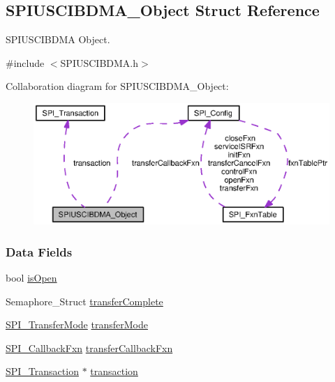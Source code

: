 \subsection{S\+P\+I\+U\+S\+C\+I\+B\+D\+M\+A\+\_\+\+Object Struct Reference}
\label{struct_s_p_i_u_s_c_i_b_d_m_a___object}


S\+P\+I\+U\+S\+C\+I\+B\+D\+M\+A Object.  




{\ttfamily \#include $<$S\+P\+I\+U\+S\+C\+I\+B\+D\+M\+A.\+h$>$}



Collaboration diagram for S\+P\+I\+U\+S\+C\+I\+B\+D\+M\+A\+\_\+\+Object\+:
\nopagebreak
\begin{figure}[H]
\begin{center}
\leavevmode
\includegraphics[width=350pt]{struct_s_p_i_u_s_c_i_b_d_m_a___object__coll__graph}
\end{center}
\end{figure}
\subsubsection*{Data Fields}
\begin{DoxyCompactItemize}
\item 
bool \hyperlink{struct_s_p_i_u_s_c_i_b_d_m_a___object_a3e6b8bb83a3cf4a65fa6fe64e621f201}{is\+Open}
\item 
Semaphore\+\_\+\+Struct \hyperlink{struct_s_p_i_u_s_c_i_b_d_m_a___object_a2facffa8ef32c57613836f4470125114}{transfer\+Complete}
\item 
\hyperlink{_s_p_i_8h_ab9ea76c6529d6076eee5e1c4a5a92c6f}{S\+P\+I\+\_\+\+Transfer\+Mode} \hyperlink{struct_s_p_i_u_s_c_i_b_d_m_a___object_a2703d15ee77ccec6100bbba531c1e83d}{transfer\+Mode}
\item 
\hyperlink{_s_p_i_8h_a207e2d5a7e7ea5606b6995b6485ca015}{S\+P\+I\+\_\+\+Callback\+Fxn} \hyperlink{struct_s_p_i_u_s_c_i_b_d_m_a___object_aa0f097248d6ba037d9c6fd40a0e13575}{transfer\+Callback\+Fxn}
\item 
\hyperlink{struct_s_p_i___transaction}{S\+P\+I\+\_\+\+Transaction} $\ast$ \hyperlink{struct_s_p_i_u_s_c_i_b_d_m_a___object_a5befed95856b2c43b79b6a8eb5c67b0d}{transaction}
\end{DoxyCompactItemize}


